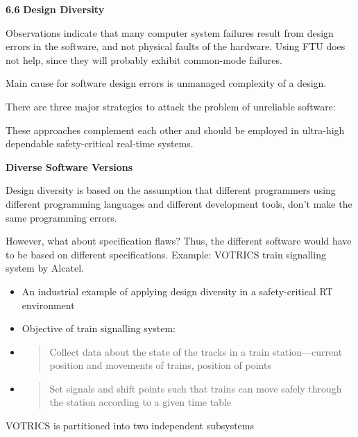 \textbf{6.6} \protect\hypertarget{teil7}{}{}\textbf{Design Diversity}

Observations indicate that many computer system failures result from
design errors in the software, and not physical faults of the hardware.
Using FTU does not help, since they will probably exhibit common-mode
failures.

Main cause for software design errors is unmanaged complexity of a
design.

There are three major strategies to attack the problem of unreliable
software:

These approaches complement each other and should be employed in
ultra-high dependable safety-critical real-time systems.

\textbf{Diverse Software Versions}

Design diversity is based on the assumption that different programmers
using different programming languages and different development tools,
don't make the same programming errors.

However, what about specification flaws? Thus, the different software
would have to be based on different specifications. Example: VOTRICS
train signalling system by Alcatel.

\begin{itemize}
\item
  An industrial example of applying design diversity in a
  safety-critical RT environment
\item
  Objective of train signalling system:
\item
  \begin{quote}
  Collect data about the state of the tracks in a train
  station---current position and movements of trains, position of points
  \end{quote}
\item
  \begin{quote}
  Set signals and shift points such that trains can move safely through
  the station according to a given time table
  \end{quote}
\end{itemize}

VOTRICS is partitioned into two independent subsystems

